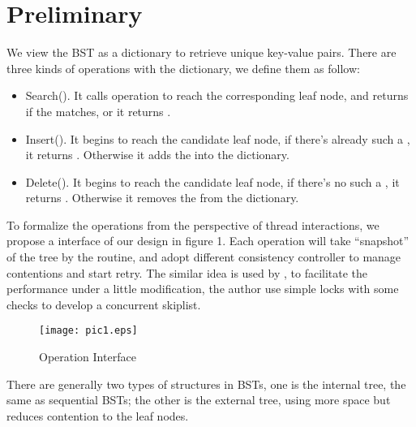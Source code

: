 \documentclass{article}
\begin{document}
\section{Preliminary}
We view the BST as a dictionary to retrieve unique key-value pairs. There are three kinds of operations with the dictionary, we define them as follow:
\begin{itemize}
\item Search(). It calls  operation to reach the corresponding leaf node, and returns  if the  matches, or it returns .
\item Insert(). It begins to reach the candidate leaf node, if there's already such a , it returns . Otherwise it adds the  into the dictionary.
\item Delete(). It begins to reach the candidate leaf node, if there's no such a , it returns . Otherwise it removes the  from the dictionary.
\end{itemize}
To formalize the operations from the perspective of thread interactions, we propose a interface of our design in figure 1. Each operation will take ``snapshot'' of the tree by the  routine, and adopt different consistency controller to manage contentions and start retry. The similar idea is used by \cite{herlihy2007simple}, to facilitate the performance under a little modification, the author use simple locks with some checks to develop a concurrent skiplist.\\
\begin{figure}[htbp]
\centering
\texttt{[image: pic1.eps]}
\caption{Operation Interface}
\label{fig:my_label1}
\end{figure}
There are generally two types of structures in BSTs, one is the internal tree, the same as sequential BSTs; the other is the external tree, using more space but reduces contention to the leaf nodes. 
\end{document}
